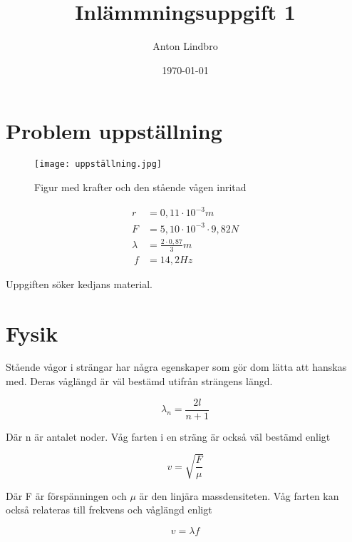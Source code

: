 \documentclass[a4paper]{article}
\title{Inlämmningsuppgift 1}
\author{Anton Lindbro}
\date{\today}
\begin{document}
\maketitle

\section{Problem uppställning}

\begin{figure}[H]
    \begin{small}
        \begin{center}
            \texttt{[image: uppställning.jpg]}
        \end{center}
        \caption{Figur med krafter och den stående vågen inritad}
        \label{fig:}
    \end{small}
\end{figure}

\begin{align}
    r &= 0,11 \cdot 10^{-3} m\\
    F &= 5,10 \cdot 10^{-3} \cdot 9,82 N\\
    \lambda &= \frac{2 \cdot 0,87}{3} m\\\
    f &= 14,2 Hz
\end{align}

Uppgiften söker kedjans material.

\section{Fysik}

Stående vågor i strängar har några egenskaper som gör dom lätta att hanskas med. Deras våglängd är väl bestämd utifrån strängens längd.

\begin{equation}
    \lambda_n = \frac{2l}{n+1}
\end{equation}

Där n är antalet noder. Våg farten i en sträng är också väl bestämd enligt

\begin{equation}
    v = \sqrt{\frac{F}{\mu}}
\end{equation}

Där F är förspänningen och $\mu$ är den linjära massdensiteten. Våg farten kan också relateras till frekvens och våglängd enligt 

\begin{equation}
    v = \lambda f
\end{equation}
\end{document}
